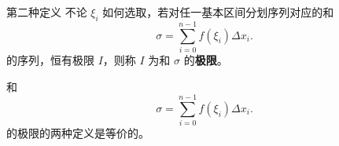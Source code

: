 \begin{definition}{第二种定义}
不论 $\xi_i$ 如何选取，若对任一基本区间分划序列对应的和 
\begin{equation}
\sigma=\sum_{i=0}^{n-1}f(\xi_i)\Delta x_i.
\end{equation}
的序列，恒有极限 $I$，则称 $I$ 为和 $\sigma$ 的\textbf{极限}。
\end{definition}
\begin{theorem}{}
和 
\begin{equation}
\sigma=\sum_{i=0}^{n-1}f(\xi_i)\Delta x_i.
\end{equation}
的极限的两种定义是等价的。
\end{theorem}